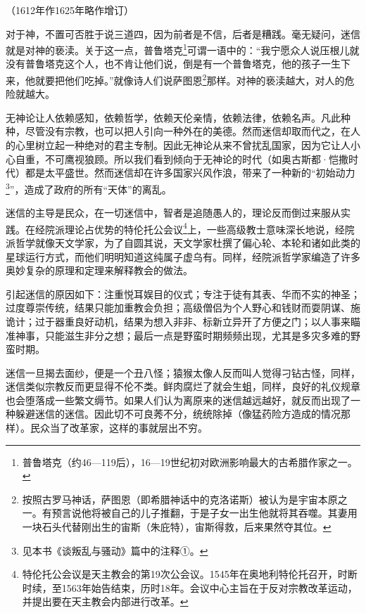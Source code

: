 \begin{center}
    （1612年作1625年略作增订）
\end{center}
\par 对于神，不置可否胜于说三道四，因为前者是不信，后者是糟践。毫无疑问，迷信就是对神的亵渎。关于这一点，普鲁塔克\footnote{普鲁塔克（约46—119后），16—19世纪初对欧洲影响最大的古希腊作家之一。}可谓一语中的：“我宁愿众人说压根儿就没有普鲁塔克这个人，也不肯让他们说，倒是有一个普鲁塔克，他的孩子一生下来，他就要把他们吃掉。”就像诗人们说萨图恩\footnote{按照古罗马神话，萨图恩（即希腊神话中的克洛诺斯）被认为是宇宙本原之一。有预言说他将被自己的儿子推翻，于是子女一出生他就将其吞噬。其妻用一块石头代替刚出生的宙斯（朱庇特），宙斯得救，后来果然夺其位。}那样。对神的亵渎越大，对人的危险就越大。
\par 无神论让人依赖感知，依赖哲学，依赖天伦亲情，依赖法律，依赖名声。凡此种种，尽管没有宗教，也可以把人引向一种外在的美德。然而迷信却取而代之，在人的心里树立起一种绝对的君主专制。因此无神论从来不曾扰乱国家，因为它让人小心自重，不可鹰视狼顾。所以我们看到倾向于无神论的时代（如奥古斯都·恺撒时代）都是太平盛世。然而迷信却在许多国家兴风作浪，带来了一种新的“初始动力\footnote{见本书《谈叛乱与骚动》篇中的注释①。}”，造成了政府的所有“天体”的离乱。
\par 迷信的主导是民众，在一切迷信中，智者是追随愚人的，理论反而倒过来服从实践。在经院派理论占优势的特伦托公会议\footnote{特伦托公会议是天主教会的第19次公会议。1545年在奥地利特伦托召开，时断时续，至1563年始告结束，历时18年。会议中心主旨在于反对宗教改革运动，并提出要在天主教会内部进行改革。}上，一些高级教士意味深长地说，经院派哲学就像天文学家，为了自圆其说，天文学家杜撰了偏心轮、本轮和诸如此类的星球运行方式，而他们明明知道这纯属子虚乌有。同样，经院派哲学家编造了许多奥妙复杂的原理和定理来解释教会的做法。
\par 引起迷信的原因如下：注重悦耳娱目的仪式；专注于徒有其表、华而不实的神圣；过度尊崇传统，结果只能加重教会负担；高级僧侣为个人野心和钱财而耍阴谋、施诡计；过于器重良好动机，结果为想入非非、标新立异开了方便之门；以人事来瞄准神事，只能滋生非分之想；最后一点是野蛮时期频频出现，尤其是多灾多难的野蛮时期。
\par 迷信一旦揭去面纱，便是一个丑八怪；猿猴太像人反而叫人觉得刁钻古怪，同样，迷信类似宗教反而更显得不伦不类。鲜肉腐烂了就会生蛆，同样，良好的礼仪规章也会堕落成一些繁文缛节。如果人们认为离原来的迷信越远越好，就反而出现了一种躲避迷信的迷信。因此切不可良莠不分，统统除掉（像猛药险方造成的情况那样）。民众当了改革家，这样的事就层出不穷。




